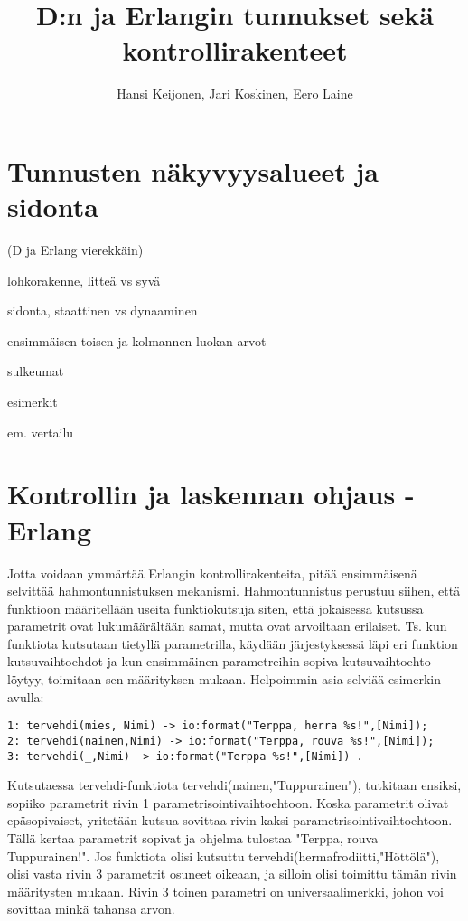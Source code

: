 \documentclass[11pt,oneside,a4paper]{article}
\title{D:n ja Erlangin tunnukset sekä kontrollirakenteet}
\author{Hansi Keijonen, Jari Koskinen, Eero Laine}
\begin{document}
\maketitle



\section{Tunnusten näkyvyysalueet ja sidonta}
(D ja Erlang vierekkäin)

lohkorakenne, litteä vs syvä

sidonta, staattinen vs dynaaminen

ensimmäisen toisen ja kolmannen luokan arvot

sulkeumat

esimerkit

em. vertailu

\section{Kontrollin ja laskennan ohjaus - Erlang}
Jotta voidaan ymmärtää Erlangin kontrollirakenteita, pitää ensimmäisenä
selvittää hahmontunnistuksen mekanismi. Hahmontunnistus perustuu siihen, että
funktioon määritellään useita funktiokutsuja siten, että jokaisessa kutsussa
parametrit ovat lukumäärältään samat, mutta ovat arvoiltaan erilaiset. Ts. kun 
funktiota kutsutaan tietyllä parametrilla, käydään järjestyksessä läpi eri
funktion kutsuvaihtoehdot ja kun ensimmäinen parametreihin sopiva
kutsuvaihtoehto löytyy, 
toimitaan sen määrityksen mukaan. Helpoimmin asia selviää esimerkin avulla: 
\begin{verbatim}
1: tervehdi(mies, Nimi) -> io:format("Terppa, herra %s!",[Nimi]);
2: tervehdi(nainen,Nimi) -> io:format("Terppa, rouva %s!",[Nimi]);
3: tervehdi(_,Nimi) -> io:format("Terppa %s!",[Nimi]) . 
\end{verbatim}


Kutsutaessa tervehdi-funktiota tervehdi(nainen,"Tuppurainen"), tutkitaan
ensiksi, sopiiko parametrit  rivin 1 parametrisointivaihtoehtoon. Koska
parametrit olivat epäsopivaiset, 
yritetään kutsua sovittaa rivin kaksi parametrisointivaihtoehtoon. Tällä kertaa
parametrit sopivat ja ohjelma tulostaa "Terppa, rouva Tuppurainen!". Jos
funktiota olisi kutsuttu
tervehdi(hermafrodiitti,"Höttölä"), olisi vasta rivin 3 parametrit osuneet
oikeaan, ja silloin olisi toimittu tämän rivin määritysten mukaan. 
Rivin 3 toinen parametri on universaalimerkki, 
johon voi sovittaa minkä tahansa arvon.
\end{document}
